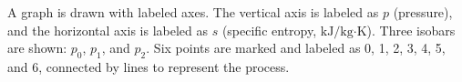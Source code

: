 A graph is drawn with labeled axes. The vertical axis is labeled as \( p \) (pressure), and the horizontal axis is labeled as \( s \) (specific entropy, \( \text{kJ/kg·K} \)). Three isobars are shown: \( p_0 \), \( p_1 \), and \( p_2 \). Six points are marked and labeled as 0, 1, 2, 3, 4, 5, and 6, connected by lines to represent the process.